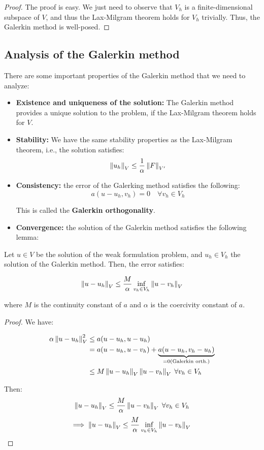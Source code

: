 \begin{proof}
    The proof is easy. We just need to observe that $V_h$ is a finite-dimensional subspace of $V$, and thus
    the Lax-Milgram theorem holds for $V_h$ trivially. Thus, the Galerkin method is well-posed. 
    
\end{proof}

\subsection{Analysis of the Galerkin method}

There are some important properties of the Galerkin method that we need to analyze:

\begin{itemize}
    \item \textbf{Existence and uniqueness of the solution:} The Galerkin method provides a unique solution
    to the problem, if the Lax-Milgram theorem holds for $V$.

    \item \textbf{Stability:} We have the same stability properties as the Lax-Milgram theorem, i.e., the solution
    satisfies:
    $$\left\|u_h\right\|_V \leq \frac{1}{\alpha} \left\|F\right\|_{V'}$$

    \item \textbf{Consistency:} the error of the Galerking method satisfies the following:
    $$a(u - u_h, v_h) = 0 \quad \forall v_h \in V_h$$

    This is called the \textbf{Galerkin orthogonality}.

    \item \textbf{Convergence:} the solution of the Galerkin method satisfies the following lemma:
\end{itemize}

\begin{flemma}
    Let $u \in V$ be the solution of the weak formulation problem, and $u_h \in V_h$ the solution of the Galerkin method.
    Then, the error satisfies:

    $$\left\|u - u_h\right\|_V \leq \frac{M}{\alpha} \inf_{v_h \in V_h} \left\|u - v_h\right\|_V$$

    where $M$ is the continuity constant of $a$ and $\alpha$ is the coercivity constant of $a$.
\end{flemma}

\begin{proof}
    We have:

    \begin{align*}
        \alpha \left\|u - u_h\right\|_V^2 &\leq a(u - u_h, u - u_h) \\
        &= a(u - u_h, u - v_h) + \underbrace{a(u - u_h, v_h - u_h)}_{= 0 (\text{Galerkin orth.})} \\
        &\leq M \left\|u - u_h\right\|_V \left\|u - v_h\right\|_V \; \forall v_h \in V_h
    \end{align*}

    Then:
    $$\left\|u - u_h\right\|_V \leq \frac{M}{\alpha} \left\|u - v_h\right\|_V \; \forall v_h \in V_h$$
    $$\Longrightarrow \; \left\|u - u_h\right\|_V \leq \frac{M}{\alpha} \inf_{v_h \in V_h} \left\|u - v_h\right\|_V$$

\end{proof}

